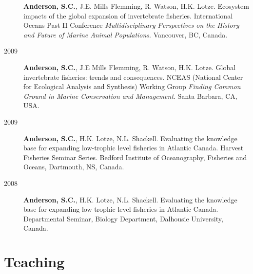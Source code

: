 \begin{description}
\textbf{Anderson, S.C.}, J.E. Mills Flemming, R. Watson, H.K. Lotze.
Ecosystem impacts of the global expansion of invertebrate fisheries.
International Oceans Past II Conference \emph{Multidisciplinary
Perspectives on the History and Future of Marine Animal Populations}.
Vancouver, BC, Canada.
\item[2009]
\textbf{Anderson, S.C.}, J.E Mills Flemming, R. Watson, H.K. Lotze.
Global invertebrate fisheries: trends and consequences. NCEAS (National
Center for Ecological Analysis and Synthesis) Working Group
\emph{Finding Common Ground in Marine Conservation and Management}.
Santa Barbara, CA, USA.
\item[2009]
\textbf{Anderson, S.C.}, H.K. Lotze, N.L. Shackell. Evaluating the
knowledge base for expanding low-trophic level fisheries in Atlantic
Canada. Harvest Fisheries Seminar Series. Bedford Institute of
Oceanography, Fisheries and Oceans, Dartmouth, NS, Canada.
\item[2008]
\textbf{Anderson, S.C.}, H.K. Lotze, N.L. Shackell. Evaluating the
knowledge base for expanding low-trophic level fisheries in Atlantic
Canada. Departmental Seminar, Biology Department, Dalhousie University,
Canada.
\end{description}

\section{Teaching}\label{teaching}

